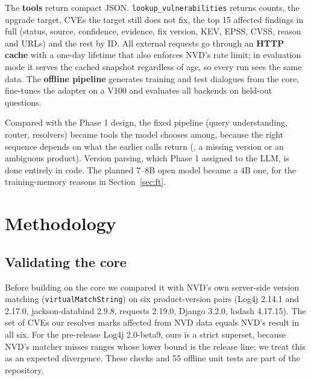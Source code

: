 \documentclass[final]{cvpr}
\begin{document}
The \textbf{tools} return compact JSON. \texttt{lookup\_vulnerabilities} returns counts, the upgrade target, CVEs the target still does not fix, the top 15 affected findings in full (status, source, confidence, evidence, fix version, KEV, EPSS, CVSS, reason and URLs) and the rest by ID. All external requests go through an \textbf{HTTP cache} with a one-day lifetime that also enforces NVD's rate limit; in evaluation mode it serves the cached snapshot regardless of age, so every run sees the same data. The \textbf{offline pipeline} generates training and test dialogues from the core, fine-tunes the adapter on a V100 and evaluates all backends on held-out questions.

Compared with the Phase 1 design, the fixed pipeline (query understanding, router, resolvers) became tools the model chooses among, because the right sequence depends on what the earlier calls return (\eg, a missing version or an ambiguous product). Version parsing, which Phase 1 assigned to the LLM, is done entirely in code. The planned 7--8B open model became a 4B one, for the training-memory reasons in Section~\ref{sec:ft}.

\section{Methodology}
\label{sec:method}

\subsection{Validating the core}
Before building on the core we compared it with NVD's own server-side version matching (\texttt{virtualMatchString}) on six product-version pairs (Log4j 2.14.1 and 2.17.0, jackson-databind 2.9.8, requests 2.19.0, Django 3.2.0, lodash 4.17.15). The set of CVEs our resolver marks affected from NVD data equals NVD's result in all six. For the pre-release Log4j 2.0-beta9, ours is a strict superset, because NVD's matcher misses ranges whose lower bound is the release line; we treat this as an expected divergence. These checks and 55 offline unit tests are part of the repository.
\end{document}
